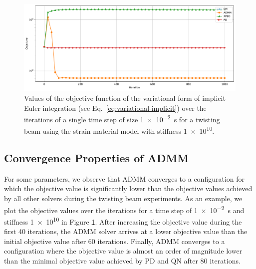 \begin{figure}[h]
    \includegraphics[width=\textwidth]{figures/strain_beam_twist_objectives.pdf}
    \caption{Values of the objective function of the variational form of implicit Euler integration (see Eq.\ \ref{eq:variational-implicit}) over the iterations of 
        a single time step of size \SI{1e-2}{\second} for a twisting beam using the strain material model with stiffness \num{1e10}.}
    \label{fig:strain-beam-twist-objectives}
\end{figure}

\subsection{Convergence Properties of ADMM}\label{ss:twisting-beam-admm}
For some parameters, we observe that ADMM converges to a configuration for which the objective value is significantly lower than the objective values 
achieved by all other solvers during the twisting beam experiments. As an example, we plot the objective values over the iterations for a time step of 
\SI{1e-2}{\second} and stiffness \num{1e10} in Figure \ref{fig:strain-beam-twist-objectives}. After increasing the objective value during the first 40 
iterations, the ADMM solver arrives at a lower objective value than the initial objective value after 60 iterations. Finally, ADMM 
converges to a configuration where the objective value is almost an order of magnitude lower than the minimal objective value achieved by PD and QN after 
80 iterations.

